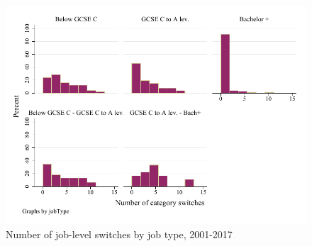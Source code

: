 \begin{figure}[!h]
\caption{Number of job-level switches by job type, 2001-2017}
\includegraphics[width=\textwidth]{../output/numberSwitchesByType}
\end{figure}
